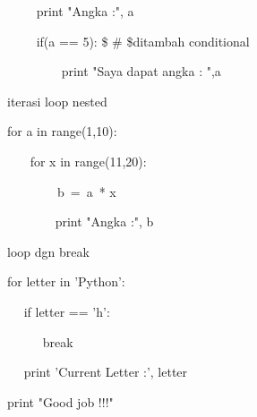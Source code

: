~~~~ print "Angka :", a \par
~~~~ if(a == 5):  \$  \#  \$ditambah conditional \par
~~~~~~~~ print "Saya dapat angka : ",a \par
\vspace{12pt}
iterasi loop nested \par
for a in range(1,10): \par
~~~ for x in range(11,20): \par
~~~~~~~~b~=~a~* x      \par
~~~~~~~ print "Angka :", b \par
\vspace{12pt}
loop dgn break \par
for letter in 'Python': \par
~~ if letter == 'h': \par
~~~~~ break \par
~~ print 'Current Letter :', letter \par
\vspace{12pt}
print "Good job !!!" \par
\vspace{12pt}
